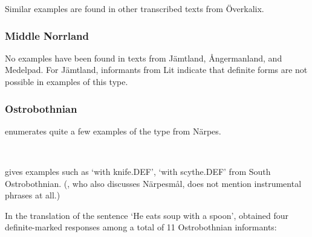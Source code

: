 \z

Similar examples are found in other transcribed texts from Överkalix. 

\subsubsection{Middle Norrland}
 No examples have been found in texts from Jämtland, Ångermanland, and Medelpad. For Jämtland, informants from Lit indicate that definite forms are not possible in examples of this type.

\subsubsection{Ostrobothnian}
\citet{Hummelstedt1934} enumerates quite a few examples of the type from Närpes. 

	
\ea\label{}
\\
	\z 
\z

\citet{Ivars2005} gives examples such as  ‘with knife.DEF’,   ‘with scythe.DEF’ from South Ostrobothnian. (\citet{Nikula1997}, who also discusses Närpesmål, does not mention instrumental phrases at all.)

In the translation of the sentence ‘He eats soup with a spoon’, \citet{ErikssonEtAl1999} obtained four definite-marked responses among a total of 11 Ostrobothnian informants:

